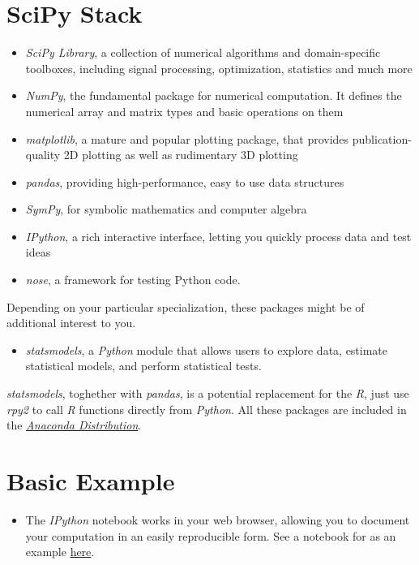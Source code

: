 \documentclass[a4paper,12pt,bold,leqno,fleqn,]{scrartcl}
\begin{document}
\section{SciPy Stack}
\begin{itemize}

\item \textit{SciPy Library}, a collection of numerical algorithms and domain-specific toolboxes, including signal processing, optimization, statistics and much more
\item \textit{NumPy}, the fundamental package for numerical computation. It defines the numerical array and matrix types and basic operations on them
\item \textit{matplotlib}, a mature and popular plotting package, that provides publication-quality 2D plotting as well as rudimentary 3D plotting
\item \textit{pandas}, providing high-performance, easy to use data structures
\item \textit{SymPy}, for symbolic mathematics and computer algebra
\item \textit{IPython}, a rich interactive interface, letting you quickly process data and test ideas
\item \textit{nose}, a framework for testing Python code.
\end{itemize}

Depending on your particular specialization, these packages might be of additional interest to you.

\begin{itemize}
\item \textit{statsmodels}, a \textit{Python} module that allows users to explore data, estimate statistical models, and perform statistical tests. 
\end{itemize}

\textit{statsmodels}, toghether with \textit{pandas}, is a potential replacement for the \textit{R}, just use \textit{rpy2} to call \textit{R} functions directly from \textit{Python}. All these packages are included in the \href{https://www.continuum.io/why-anaconda}{\textit{Anaconda Distribution}}.
\section{Basic Example}
\begin{itemize}
\item The \textit{IPython} notebook works in your web browser, allowing you to document your computation in an easily reproducible form. See a notebook for 
\citet{Reinhart.2010} as an example \href{http://nbviewer.jupyter.org/github/vincentarelbundock/Reinhart-Rogoff/blob/master/reinhart-rogoff.ipynb}{here}.
\end{itemize}
\end{document}
